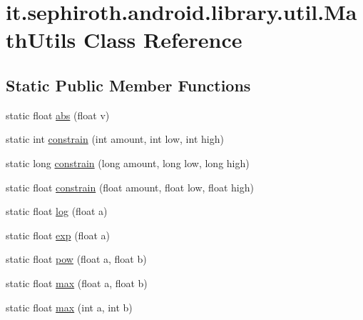 \hypertarget{classit_1_1sephiroth_1_1android_1_1library_1_1util_1_1_math_utils}{}\section{it.\+sephiroth.\+android.\+library.\+util.\+Math\+Utils Class Reference}
\label{classit_1_1sephiroth_1_1android_1_1library_1_1util_1_1_math_utils}
\subsection*{Static Public Member Functions}
\begin{DoxyCompactItemize}
\item 
static float \hyperlink{classit_1_1sephiroth_1_1android_1_1library_1_1util_1_1_math_utils_adfe3fef91d01c1c2af2f61bbe7ad1207}{abs} (float v)
\item 
static int \hyperlink{classit_1_1sephiroth_1_1android_1_1library_1_1util_1_1_math_utils_acbd8e1c09cc6f032dad7b5a1cfeb8512}{constrain} (int amount, int low, int high)
\item 
static long \hyperlink{classit_1_1sephiroth_1_1android_1_1library_1_1util_1_1_math_utils_a2ad2be73500c1bbf9e1919d4c4bc86a1}{constrain} (long amount, long low, long high)
\item 
static float \hyperlink{classit_1_1sephiroth_1_1android_1_1library_1_1util_1_1_math_utils_acefd7c02b48005b091574791aa3ddb0d}{constrain} (float amount, float low, float high)
\item 
static float \hyperlink{classit_1_1sephiroth_1_1android_1_1library_1_1util_1_1_math_utils_aac6f4224b6fcd2c6eaaaa802177869f0}{log} (float a)
\item 
static float \hyperlink{classit_1_1sephiroth_1_1android_1_1library_1_1util_1_1_math_utils_ac5341568c8704539bf922023efa124ee}{exp} (float a)
\item 
static float \hyperlink{classit_1_1sephiroth_1_1android_1_1library_1_1util_1_1_math_utils_a9ee77883697a78502abb204da6fb04fe}{pow} (float a, float b)
\item 
static float \hyperlink{classit_1_1sephiroth_1_1android_1_1library_1_1util_1_1_math_utils_af76b62ded953ed9fab214ab185cdd901}{max} (float a, float b)
\item 
static float \hyperlink{classit_1_1sephiroth_1_1android_1_1library_1_1util_1_1_math_utils_a9ab4b776f8563036a93a71864f0a57c6}{max} (int a, int b)
\item 

\end{DoxyCompactItemize}
